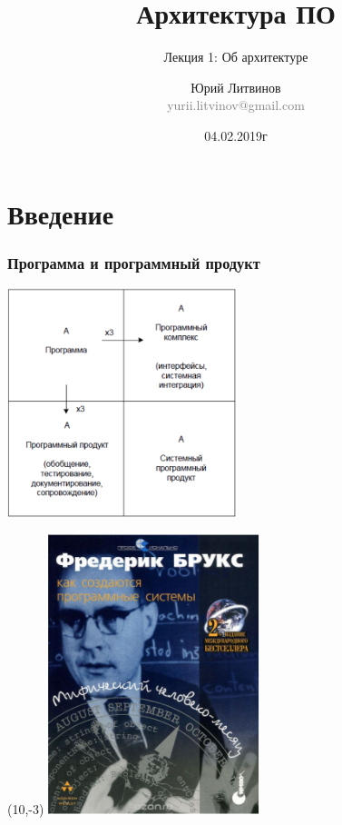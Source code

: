 \documentclass[xetex,mathserif,serif]{beamer}
\title{Архитектура ПО}
\subtitle{Лекция 1: Об архитектуре}
\author[Юрий Литвинов]{Юрий Литвинов\\\small{\textcolor{gray}{yurii.litvinov@gmail.com}}}
\date{04.02.2019г}
\begin{document}
	\frame{\titlepage}

	\section{Введение}

	\begin{frame}
		\frametitle{Программа и программный продукт}
		\begin{center}
			\includegraphics[width=0.5\textwidth]{brooksSquare.png}
		\end{center}
		\begin{textblock}{2}(10,-3)
			\includegraphics[width=\textwidth]{brooksCover.png}
		\end{textblock}
	\end{frame}
\end{document}
